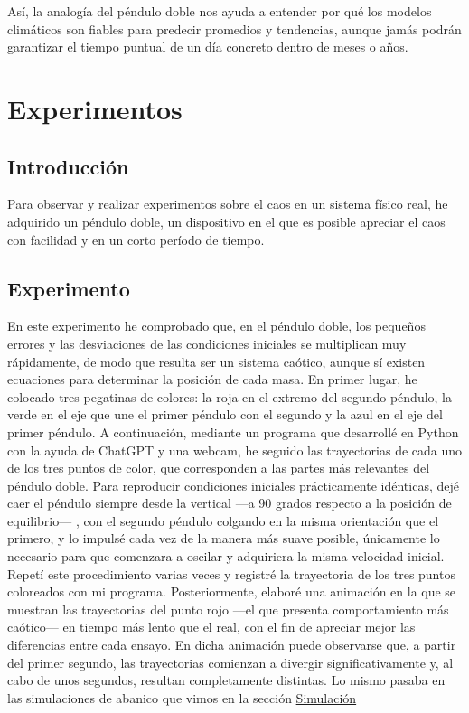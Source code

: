\documentclass[
  10pt,
  a4paper,
  DIV=11,
  numbers=noendperiod,
  open=any]{scrreprt}
\numberwithin{equation}{chapter}
\numberwithin{equation}{section}
\renewcommand{\[}{\begin{equation}}
\renewcommand{\]}{\end{equation}}
\begin{document}
Así, la analogía del péndulo doble nos ayuda a entender por qué los
modelos climáticos son fiables para predecir promedios y tendencias,
aunque jamás podrán garantizar el tiempo puntual de un día concreto
dentro de meses o años.

\chapter{Experimentos}\label{experimentos}

\section{Introducción}\label{introducciuxf3n-4}

Para observar y realizar experimentos sobre el caos en un sistema físico
real, he adquirido un péndulo doble, un dispositivo en el que es posible
apreciar el caos con facilidad y en un corto período de tiempo.

\section{Experimento}\label{experimento}

En este experimento he comprobado que, en el péndulo doble, los pequeños
errores y las desviaciones de las condiciones iniciales se multiplican
muy rápidamente, de modo que resulta ser un sistema caótico, aunque sí
existen ecuaciones para determinar la posición de cada masa. En primer
lugar, he colocado tres pegatinas de colores: la roja en el extremo del
segundo péndulo, la verde en el eje que une el primer péndulo con el
segundo y la azul en el eje del primer péndulo. A continuación, mediante
un programa que desarrollé en Python con la ayuda de ChatGPT y una
webcam, he seguido las trayectorias de cada uno de los tres puntos de
color, que corresponden a las partes más relevantes del péndulo doble.
Para reproducir condiciones iniciales prácticamente idénticas, dejé caer
el péndulo siempre desde la vertical ---a 90 grados respecto a la
posición de equilibrio--- , con el segundo péndulo colgando en la misma
orientación que el primero, y lo impulsé cada vez de la manera más suave
posible, únicamente lo necesario para que comenzara a oscilar y
adquiriera la misma velocidad inicial. Repetí este procedimiento varias
veces y registré la trayectoria de los tres puntos coloreados con mi
programa. Posteriormente, elaboré una animación en la que se muestran
las trayectorias del punto rojo ---el que presenta comportamiento más
caótico--- en tiempo más lento que el real, con el fin de apreciar mejor
las diferencias entre cada ensayo. En dicha animación puede observarse
que, a partir del primer segundo, las trayectorias comienzan a divergir
significativamente y, al cabo de unos segundos, resultan completamente
distintas. Lo mismo pasaba en las simulaciones de abanico que vimos en
la sección \hyperref[sec-abanico]{Simulación}
\end{document}
